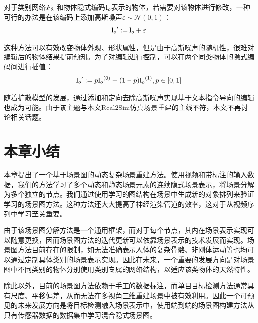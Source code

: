 对于类别网络$F_{{\theta_{c}}}$和物体隐式编码${\mathbf{l}_o}$表示的物体，若需要对该物体进行修改，一种可行的办法是在该编码上添加高斯噪声$\varepsilon\sim\mathcal{N}(0, 1)$：
\begin{equation}
    {\mathbf{l}_o}' := {\mathbf{l}_o} + \varepsilon
\end{equation}

这种方法可以有效改变物体外观、形状属性，但是由于高斯噪声的随机性，很难对编辑后的物体结果提前预知。为了对编辑进行控制，可以在两个同类物体的隐式编码间进行插值：
\begin{equation}
    \latent' := p\latent^{(0)} + (1 - p)\latent^{(1)}, \quad p\in[0,1]
\end{equation}

随着扩散模型\cite{ho_denoising_2020, poole_dreamfusion_2022, yang_learning_2023}的发展，通过添加和定向去除高斯噪声实现基于文本指令导向的编辑也成为可能。由于该主题与本文Real2Sim仿真场景重建的主线不符，本文不再讨论相关话题。

\section{本章小结}  
本章提出了一个基于场景图的动态复杂场景重建方法。使用视频和带标注的输入数据，我们的方法学习了多个动态和静态场景元素的连续隐式场景表示，将场景分解为多个独立的节点。我们通过使用学习的图结构在场景中生成新的对象排列来验证学习的场景图方法。这种方法还大大提高了神经渲染管道的效率，这对于从视频序列中学习至关重要。

由于该场景图分解方法是一个通用框架，而对于每个节点，其内在场景表示实现可以随意更换，因而场景图方法的迭代更新可以依靠场景表示的技术发展而实现。场景图方法目前存在的限制，如无法准确表示人体的复杂骨骼、非刚体运动等也均可以通过定制具体类别的场景表示实现。因此在未来，一个重要的发展方向是对场景图中不同类别的物体分别使用类别专属的网络结构，以适应该类物体的天然特性。

除此以外，目前的场景图方法依赖于手工的数据标注，而单目目标检测方法通常具有尺度、平移偏差，从而无法在多视角三维重建场景中被有效利用。因此一个可预见的未来发展方向是将目标检测融入场景表示中，使用端到端的场景图构建方法从只有传感器数据的数据集中学习混合隐式场景图。
